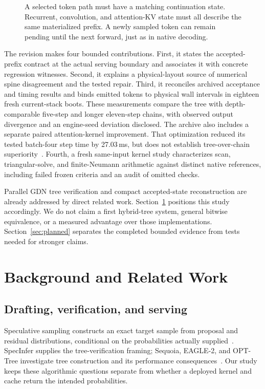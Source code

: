 \documentclass[conference]{IEEEtran}
\begin{document}
\begin{figure}[t]
\centering

\caption{A selected token path must have a matching continuation state. Recurrent, convolution, and attention-KV state must all describe the same materialized prefix. A newly sampled token can remain pending until the next forward, just as in native decoding.}
\label{fig:contract}
\end{figure}

The revision makes four bounded contributions. First, it states the accepted-prefix contract at the actual serving boundary and associates it with concrete regression witnesses. Second, it explains a physical-layout source of numerical spine disagreement and the tested repair. Third, it reconciles archived acceptance and timing results and binds emitted tokens to physical wall intervals in eighteen fresh current-stack boots. These measurements compare the tree with depth-comparable five-step and longer eleven-step chains, with observed output divergence and an engine-seed deviation disclosed. The archive also includes a separate paired attention-kernel improvement. That optimization reduced its tested batch-four step time by 27.03\,ms, but does not establish tree-over-chain superiority~\cite{lumo2026paired}. Fourth, a fresh same-input kernel study characterizes scan, triangular-solve, and finite-Neumann arithmetic against distinct native references, including failed frozen criteria and an audit of omitted checks.

Parallel GDN tree verification and compact accepted-state reconstruction are already addressed by direct related work. Section~\ref{sec:related} positions this study accordingly. We do not claim a first hybrid-tree system, general bitwise equivalence, or a measured advantage over those implementations. Section~\ref{sec:planned} separates the completed bounded evidence from tests needed for stronger claims.

\section{Background and Related Work}
\label{sec:related}
\subsection{Drafting, verification, and serving}
Speculative sampling constructs an exact target sample from proposal and residual distributions, conditional on the probabilities actually supplied~\cite{leviathan2023fast,chen2023sampling}. SpecInfer supplies the tree-verification framing; Sequoia, EAGLE-2, and OPT-Tree investigate tree construction and its performance consequences~\cite{miao2023specinfer,chen2024sequoia,li2024eagle,wang2024opt}. Our study keeps these algorithmic questions separate from whether a deployed kernel and cache return the intended probabilities.
\end{document}
